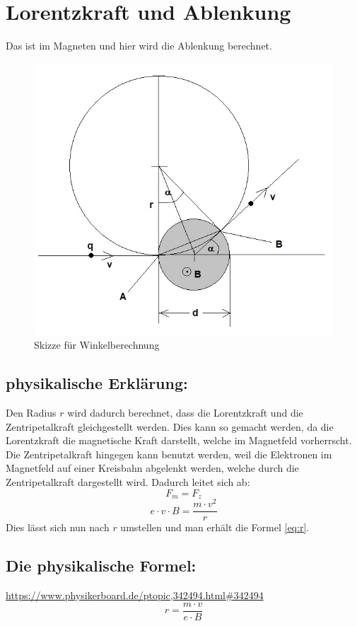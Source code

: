 \section{Lorentzkraft und Ablenkung}

Das ist im Magneten und hier wird die Ablenkung berechnet.
\begin{figure}
    \centering
    \includegraphics[width=.75\textwidth]{fig/elektronenstrahl-ablenkung_101.jpg}
    \caption{Skizze für Winkelberechnung}
    \label{fig:ausBlock}
\end{figure}

\subsection{physikalische Erklärung:}
Den Radius $r$ wird dadurch berechnet, dass die Lorentzkraft und die Zentripetalkraft gleichgestellt werden. Dies kann so gemacht werden, da die Lorentzkraft die magnetische Kraft darstellt, welche im Magnetfeld vorherrscht. Die Zentripetalkraft hingegen kann benutzt werden, weil die Elektronen im Magnetfeld auf einer Kreisbahn abgelenkt werden, welche durch die Zentripetalkraft dargestellt wird. Dadurch leitet sich ab:
$$ F_m=F_z$$
$$ e \cdot v \cdot B = \frac{m \cdot v^2}{r}$$
Dies lässt sich nun nach $r$ umstellen und man erhält die Formel \ref{eq:r}.   

\subsection{Die physikalische Formel:}
\url{https://www.physikerboard.de/ptopic,342494.html#342494}
\begin{equation}
     \label{eq:r}
     r = \frac{m \cdot v}{e \cdot B}
\end{equation}



